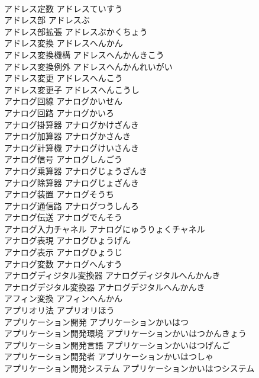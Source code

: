 \documentclass[8pt]{extreport}
\begin{document}
\begin{CJK}{UTF8}{min}
\\	アドレス定数	アドレスていすう	
\\	アドレス部	アドレスぶ	
\\	アドレス部拡張	アドレスぶかくちょう	
\\	アドレス変換	アドレスへんかん	
\\	アドレス変換機構	アドレスへんかんきこう	
\\	アドレス変換例外	アドレスへんかんれいがい	
\\	アドレス変更	アドレスへんこう	
\\	アドレス変更子	アドレスへんこうし	
\\	アナログ回線	アナログかいせん	
\\	アナログ回路	アナログかいろ	
\\	アナログ掛算器	アナログかけざんき	
\\	アナログ加算器	アナログかさんき	
\\	アナログ計算機	アナログけいさんき	
\\	アナログ信号	アナログしんごう	
\\	アナログ乗算器	アナログじょうざんき	
\\	アナログ除算器	アナログじょざんき	
\\	アナログ装置	アナログそうち	
\\	アナログ通信路	アナログつうしんろ	
\\	アナログ伝送	アナログでんそう	
\\	アナログ入力チャネル	アナログにゅうりょくチャネル	
\\	アナログ表現	アナログひょうげん	
\\	アナログ表示	アナログひょうじ	
\\	アナログ変数	アナログへんすう	
\\	アナログディジタル変換器	アナログディジタルへんかんき	
\\	アナログデジタル変換器	アナログデジタルへんかんき	
\\	アフィン変換	アフィンへんかん	
\\	アプリオリ法	アプリオリほう	
\\	アプリケーション開発	アプリケーションかいはつ	
\\	アプリケーション開発環境	アプリケーションかいはつかんきょう	
\\	アプリケーション開発言語	アプリケーションかいはつげんご	
\\	アプリケーション開発者	アプリケーションかいはつしゃ	
\\	アプリケーション開発システム	アプリケーションかいはつシステム	

\end{CJK}
\end{document}
